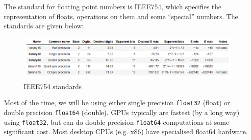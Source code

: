 \documentclass[a4paper, openany]{memoir}
\begin{document}
    The standard for floating point numbers is IEEE754, which specifies the representation of floats, operations on them and some ``special'' numbers. The standards are given below:
    \begin{figure}[H]
        \centering
        \includegraphics[scale=0.55]{src/1.2 IEEE754 standards.PNG}
        \caption{IEEE754 standards}
    \end{figure}
    Most of the time, we will be using either single precision \texttt{float32} (float) or double precision \texttt{float64} (double). GPUs typically are fastest (by a long way) using \texttt{float32}, but can do double precision \texttt{float64} computations at some significant cost. Most desktop CPUs (e.g. x86) have specialised float64 hardware.
\end{document}
